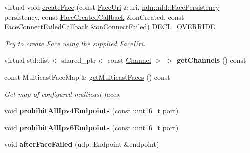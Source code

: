 \begin{DoxyCompactItemize}
\item 
virtual void \hyperlink{classnfd_1_1UdpFactory_af218bef7aaec0a3e2d84b5ce013e71dd}{create\+Face} (const \hyperlink{classndn_1_1util_1_1FaceUri}{Face\+Uri} \&uri, \hyperlink{group__management_ga05df4b7c484a0fae25d3e65962511bac}{ndn\+::nfd\+::\+Face\+Persistency} persistency, const \hyperlink{namespacenfd_a6d4b91580c829552a452c53458381b0f}{Face\+Created\+Callback} \&on\+Created, const \hyperlink{namespacenfd_ae87d4f07de26f4939691439b51f2dd83}{Face\+Connect\+Failed\+Callback} \&on\+Connect\+Failed) D\+E\+C\+L\+\_\+\+O\+V\+E\+R\+R\+I\+DE
\begin{DoxyCompactList}\small\item\em Try to create \hyperlink{classnfd_1_1Face}{Face} using the supplied Face\+Uri. \end{DoxyCompactList}\item 
virtual std\+::list$<$ shared\+\_\+ptr$<$ const \hyperlink{classnfd_1_1Channel}{Channel} $>$ $>$ {\bfseries get\+Channels} () const\hypertarget{classnfd_1_1UdpFactory_a66487b4809d42ebea137d32f79914174}{}\label{classnfd_1_1UdpFactory_a66487b4809d42ebea137d32f79914174}

\item 
const Multicast\+Face\+Map \& \hyperlink{classnfd_1_1UdpFactory_ab80e616911b9b2da5145762d703f09a1}{get\+Multicast\+Faces} () const\hypertarget{classnfd_1_1UdpFactory_ab80e616911b9b2da5145762d703f09a1}{}\label{classnfd_1_1UdpFactory_ab80e616911b9b2da5145762d703f09a1}

\begin{DoxyCompactList}\small\item\em Get map of configured multicast faces. \end{DoxyCompactList}\item 
void {\bfseries prohibit\+All\+Ipv4\+Endpoints} (const uint16\+\_\+t port)\hypertarget{classnfd_1_1UdpFactory_af91053d8672aa99df43a951a80b75a88}{}\label{classnfd_1_1UdpFactory_af91053d8672aa99df43a951a80b75a88}

\item 
void {\bfseries prohibit\+All\+Ipv6\+Endpoints} (const uint16\+\_\+t port)\hypertarget{classnfd_1_1UdpFactory_af695907724adeb4a1ccaa80f9d581640}{}\label{classnfd_1_1UdpFactory_af695907724adeb4a1ccaa80f9d581640}

\item 
void {\bfseries after\+Face\+Failed} (udp\+::\+Endpoint \&endpoint)\hypertarget{classnfd_1_1UdpFactory_ae4eaa95482900ee5fb7b11b31b00ceb8}{}\label{classnfd_1_1UdpFactory_ae4eaa95482900ee5fb7b11b31b00ceb8}


\end{DoxyCompactItemize}
